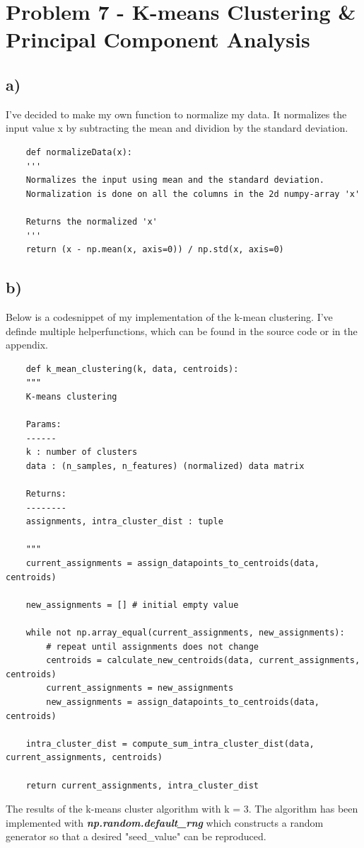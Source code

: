 \section{Problem 7 - K-means Clustering \& Principal Component Analysis}

\subsection {a)}
I've decided to make my own function to normalize my data. It normalizes the input
value x by subtracting the mean and dividion by the standard deviation.
\begin{verbatim}
    def normalizeData(x):
    '''
    Normalizes the input using mean and the standard deviation.
    Normalization is done on all the columns in the 2d numpy-array 'x'

    Returns the normalized 'x'
    '''
    return (x - np.mean(x, axis=0)) / np.std(x, axis=0)
\end{verbatim}

\subsection {b)}
Below is a codesnippet of my implementation of the k-mean clustering.
I've definde multiple helperfunctions, which can be found in the source code or in
the appendix.
\begin{verbatim}
    def k_mean_clustering(k, data, centroids):
    """
    K-means clustering

    Params:
    ------
    k : number of clusters
    data : (n_samples, n_features) (normalized) data matrix

    Returns:
    --------
    assignments, intra_cluster_dist : tuple

    """
    current_assignments = assign_datapoints_to_centroids(data, centroids)

    new_assignments = [] # initial empty value

    while not np.array_equal(current_assignments, new_assignments):
        # repeat until assignments does not change
        centroids = calculate_new_centroids(data, current_assignments, centroids)
        current_assignments = new_assignments
        new_assignments = assign_datapoints_to_centroids(data, centroids)

    intra_cluster_dist = compute_sum_intra_cluster_dist(data, current_assignments, centroids)
    
    return current_assignments, intra_cluster_dist

\end{verbatim}
The results of the k-means cluster algorithm with k = 3. The algorithm has been
implemented with \textit{\textbf{np.random.default\_rng}} which constructs a random generator
so that a desired "seed\_value" can be reproduced. 

